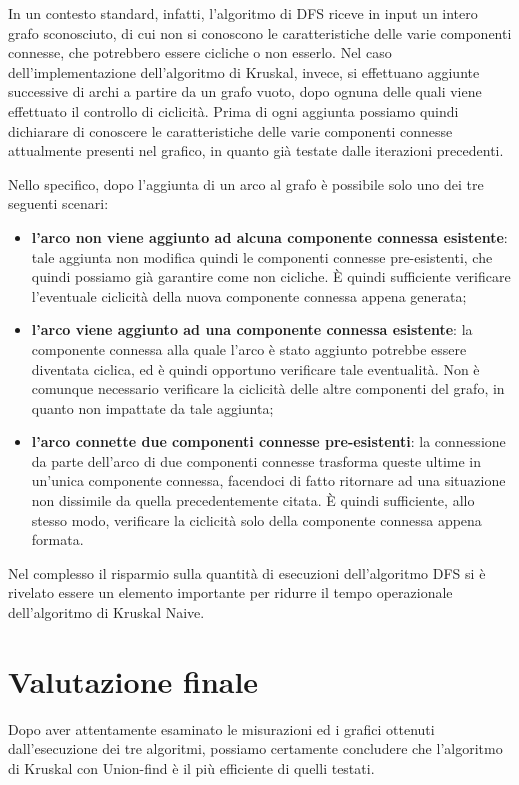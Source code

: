 In un contesto standard, infatti, l'algoritmo di DFS riceve in input un intero grafo sconosciuto, di cui non si conoscono le caratteristiche delle varie componenti connesse, che potrebbero essere cicliche o non esserlo. Nel caso dell'implementazione dell'algoritmo di Kruskal, invece, si effettuano aggiunte successive di archi a partire da un grafo vuoto, dopo ognuna delle quali viene effettuato il controllo di ciclicità. Prima di ogni aggiunta possiamo quindi dichiarare di conoscere le caratteristiche delle varie componenti connesse attualmente presenti nel grafico, in quanto già testate dalle iterazioni precedenti.

Nello specifico, dopo l'aggiunta di un arco al grafo è possibile solo uno dei tre seguenti scenari:
\begin{itemize}
	\item \textbf{l'arco non viene aggiunto ad alcuna componente connessa esistente}: tale aggiunta non modifica quindi le componenti connesse pre-esistenti, che quindi possiamo già garantire come non cicliche. È quindi sufficiente verificare l'eventuale ciclicità della nuova componente connessa appena generata;
	\item \textbf{l'arco viene aggiunto ad una componente connessa esistente}: la componente connessa alla quale l'arco è stato aggiunto potrebbe essere diventata ciclica, ed è quindi opportuno verificare tale eventualità. Non è comunque necessario verificare la ciclicità delle altre componenti del grafo, in quanto non impattate da tale aggiunta;
	\item \textbf{l'arco connette due componenti connesse pre-esistenti}: la connessione da parte dell'arco di due componenti connesse trasforma queste ultime in un'unica componente connessa, facendoci di fatto ritornare ad una situazione non dissimile da quella precedentemente citata. È quindi sufficiente, allo stesso modo, verificare la ciclicità solo della componente connessa appena formata.
\end{itemize}
Nel complesso il risparmio sulla quantità di esecuzioni dell'algoritmo DFS si è rivelato essere un elemento importante per ridurre il tempo operazionale dell'algoritmo di Kruskal Naive.

\section{Valutazione finale}
Dopo aver attentamente esaminato le misurazioni ed i grafici ottenuti dall'esecuzione dei tre algoritmi, possiamo certamente concludere che l'algoritmo di Kruskal con Union-find è il più efficiente di quelli testati.

